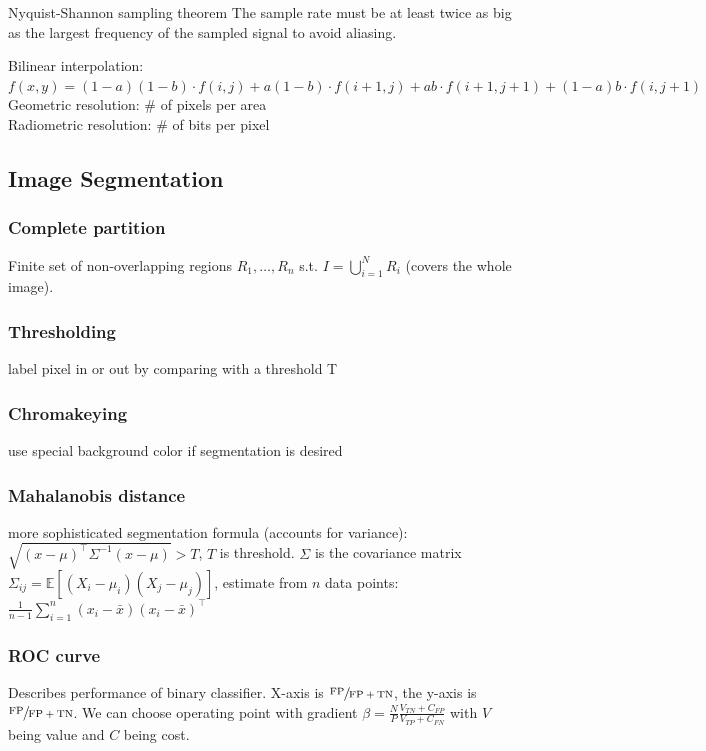 \documentclass[a4paper,10pt]{article}
\begin{document}
\begin{mainbox}{Nyquist-Shannon sampling theorem}
    The sample rate must be at least twice as big as the largest frequency of the sampled signal to avoid aliasing.
\end{mainbox}

\noindent Bilinear interpolation: \(f(x,y) = (1-a)(1-b) \cdot f(i,j) + a(1-b) \cdot f(i+1,j) + ab \cdot f(i+1, j+1) + (1-a)b \cdot f(i,j+1)\) \\
Geometric resolution: \# of pixels per area \\
Radiometric resolution: \# of bits per pixel 

\subsection{Image Segmentation}
\subsubsection{Complete partition} 
Finite set of non-overlapping regions \( R_1, \dots, R_n \) s.t. \( I = \bigcup_{i=1}^N R_i \) (covers the whole image). 

\subsubsection{Thresholding} 
label pixel in or out by comparing with a threshold T

\subsubsection{Chromakeying}
use special background color if segmentation is desired 

\subsubsection{Mahalanobis distance} 
more sophisticated segmentation formula (accounts for variance): \( \sqrt{(x - \mu)^\top \Sigma^{-1}(x - \mu)} > T \), \( T \) is threshold. \( \Sigma  \) is the covariance matrix\\ \( \Sigma_{ij} = \mathbb{E}\left[(X_i - \mu_i)(X_j - \mu_j) \right] \), estimate from \( n \) data points: \( \frac{1}{n-1} \sum_{i=1}^{n} (x_i - \bar{x})(x_i - \bar{x})^\top \)

\subsubsection{ROC curve} 
Describes performance of binary classifier. X-axis is \( \sfrac{\text{FP}}{\text{FP}+\text{TN}} \), the y-axis is \( \sfrac{\text{FP}}{\text{FP} + \text{TN}} \). We can choose operating point with gradient \( \beta = \frac{N}{P} \frac{V_{TN} + C_{FP}}{V_{TP} + C_{FN}} \) with \( V \) being value and \( C \) being cost.
\end{document}

